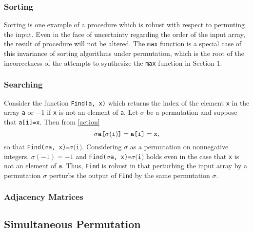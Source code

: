 \documentclass{llncs}
\begin{document}
\subsubsection{Sorting}

Sorting is one example of a procedure which is robust with respect to permuting the input.  Even in the face of uncertainty regarding the order of the input array, the result of procedure will not be altered.  The \verb!max! function is a special case of this invariance of sorting algorithms under permutation, which is the root of the incorrectness of the attempts to synthesize the \verb!max! function in Section 1.

\subsubsection{Searching}

Consider the function \verb!Find(a, x)! which returns the index of the element \verb!x! in the array \verb!a! or \(-1\) if \verb!x! is not an element of \verb!a!.  Let \(\sigma\) be a permutation and suppose that \verb!a[i]=x!.  Then from \eqref{action}
\[\sigma\verb!a[!\sigma(\verb!i!)\verb!]! = \verb!a[i]! = \verb!x!,\]
so that \verb!Find(!\(\sigma\)\verb!a, x)=!\(\sigma(\)\verb!i!\()\).  Considering \(\sigma\) as a permutation on nonnegative integers, \(\sigma(-1) = -1\) and \verb!Find(!\(\sigma\)\verb!a, x)=!\(\sigma(\)\verb!i!\()\) holds even in the case that \verb!x! is not an element of \verb!a!.  Thus, \verb!Find! is robust in that perturbing the input array by a permutation \(\sigma\) perturbs the output of \verb!Find! by the same permutation \(\sigma\).

\subsubsection{Adjacency Matrices}


\subsection{Simultaneous Permutation}
\end{document}

